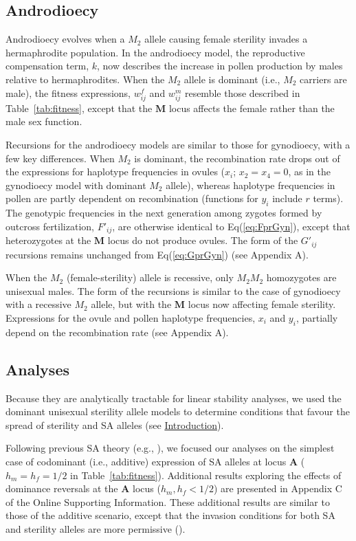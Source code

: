 \documentclass{article}
\newcommand\hl[1]{%
  \bgroup
  \hskip0pt\color{blue!80!black}%
  #1%
  \egroup
}
\begin{document}
\subsection*{Androdioecy}

Androdioecy evolves when a $M_2$ allele causing female sterility invades a hermaphrodite population. In the androdioecy model, the reproductive compensation term, $k$, now describes the increase in pollen production by males relative to hermaphrodites. When the $M_2$ allele is dominant (i.e., $M_2$ carriers are male), the fitness expressions, $w^f_{ij}$ and $w^m_{ij}$ resemble those described in Table~\ref{tab:fitness}, except that the $\mathbf{M}$ locus affects the female rather than the male sex function. 

Recursions for the androdioecy models are similar to those for gynodioecy, with a few key differences. When $M_2$ is dominant, the recombination rate drops out of the expressions for haplotype frequencies in ovules ($x_i$; $x_2=x_4=0$, as in the gynodioecy model with dominant $M_2$ allele), whereas haplotype frequencies in pollen are partly dependent on recombination (functions for $y_i$ include $r$ terms). The genotypic frequencies in the next generation among zygotes formed by outcross fertilization, $F'_{ij}$, are otherwise identical to Eq(\ref{eq:FprGyn}), except that heterozygotes at the $\mathbf{M}$ locus do not produce ovules. The form of the $G'_{ij}$ recursions remains unchanged from Eq(\ref{eq:GprGyn}) (see Appendix A).

When the $M_2$ (female-sterility) allele is recessive, only $M_2 M_2$ homozygotes are unisexual males. The form of the recursions is similar to the case of gynodioecy with a recessive $M_2$ allele, but with the $\mathbf{M}$ locus now affecting female sterility. Expressions for the ovule and pollen haplotype frequencies, $x_i$ and $y_i$, partially depend on the recombination rate (see Appendix A).


\subsection*{Analyses} \label{subsec:analyses}

Because they are analytically tractable for linear stability analyses, we used the dominant unisexual sterility allele models to determine conditions that favour the spread of sterility and SA alleles (see \hyperref[sec:Introduction]{Introduction}).  

Following previous SA theory (e.g., \citealp{Kidwell1977, Prout2000, JordanConnallon2014}), we focused our analyses on the simplest case of codominant (i.e., additive) expression of SA alleles at locus $\mathbf{A}$ ($h_m = h_f = 1/2$ in Table~\ref{tab:fitness}). Additional results exploring the effects of dominance reversals at the $\mathbf{A}$ locus ($h_m, h_f < 1/2$) are presented in Appendix C of the Online Supporting Information. These additional results are \hl{similar to those of the additive scenario, except that the invasion conditions for both SA and sterility alleles are more permissive} (\citealt{Fry2010, JordanConnallon2014, Olito2017}).
\end{document}
